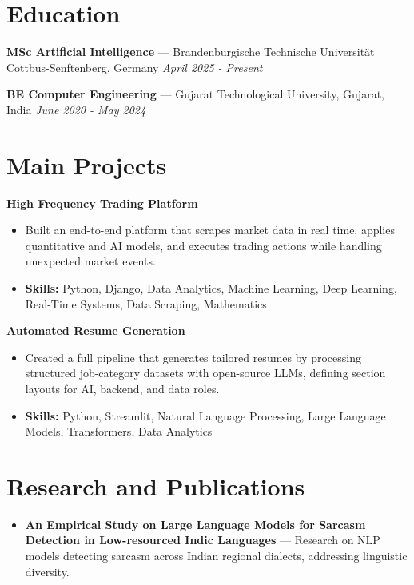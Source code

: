 \documentclass[a4paper,10pt]{article}
\begin{document}
\section*{Education}
\textbf{MSc Artificial Intelligence} — Brandenburgische Technische Universität Cottbus-Senftenberg, Germany \hfill \textit{April 2025 - Present}\par
\vspace{1.5pt}
\textbf{BE Computer Engineering} — Gujarat Technological University, Gujarat, India \hfill \textit{June 2020 - May 2024}\par

\section*{Main Projects}
\textbf{High Frequency Trading Platform}\par
\vspace{1pt}
\begin{itemize}
  \item Built an end-to-end platform that scrapes market data in real time, applies quantitative and AI models, and executes trading actions while handling unexpected market events.
  \item \textbf{Skills:} Python, Django, Data Analytics, Machine Learning, Deep Learning, Real-Time Systems, Data Scraping, Mathematics
\end{itemize}
\vspace{3pt}
\textbf{Automated Resume Generation}\par
\vspace{1pt}
\begin{itemize}
  \item Created a full pipeline that generates tailored resumes by processing structured job-category datasets with open-source LLMs, defining section layouts for AI, backend, and data roles.
  \item \textbf{Skills:} Python, Streamlit, Natural Language Processing, Large Language Models, Transformers, Data Analytics
\end{itemize}

\section*{Research and Publications}
\begin{itemize}
\item \textbf{An Empirical Study on Large Language Models for Sarcasm Detection in Low-resourced Indic Languages} — Research on NLP models detecting sarcasm across Indian regional dialects, addressing linguistic diversity.
\end{itemize}
\end{document}
